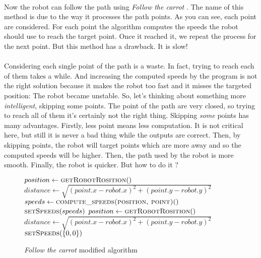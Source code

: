 \paragraph{}{
   Now the robot can follow the path using \textit{Follow the carrot}
 \cite{thesis:barton}. The name of this method is due to the way it processes
 the path points. As you can see, each point are considered. For each point the
 algorithm computes the speeds the robot should use to reach the target point.
 Once it reached it, we repeat the process for the next point. But this
 method has a drawback. It is slow!
}

\paragraph{}{
    Considering each single point of the path is a waste. In fact, trying to
 reach each of them takes a while. And increasing the computed speeds by the
 program is not the right solution because it makes the robot too fast and it
 misses the targeted position: The robot became unstable. So, let's thinking
 about something more \textit{intelligent}, skipping some points. \newline
 The point of the path are very closed, so trying to reach all of them it's
 certainly not the right thing. Skipping \textit{some} points has many
 advantages. Firstly, less point means less computation. It is not critical  
 here, but still it is never a bad thing while the outputs are correct. Then, by
 skipping points, the robot will target points which are more away and so the
 computed speeds will be higher. Then, the path used by the robot is more
 smooth. Finally, the robot is quicker. But how to do it ?
}

\begin{figure}[!h]
    \begin{algorithmic}
            \State $position \gets \Call{getRobotRosition}$
            \State $distance \gets \sqrt{(point.x - robot.x)^{2} + (point.y - robot.y)^{2}}$
                    \State $speeds \gets \Call{compute\_speeds(position, point)}$
                    \State $\Call{setSpeeds}{speeds}$
                    \State $position \gets \Call{getRobotRosition}$
                    \State $distance \gets \sqrt{(point.x - robot.x)^{2} + (point.y - robot.y)^{2}}$
                \EndWhile
            \EndIf
        \EndFor
        \State $\Call{setSpeeds}{\{ 0, 0\}}$
    \end{algorithmic}
    
    \caption{
        \label{algo:v2}
        \textit{Follow the carrot} modified algorithm
    }
\end{figure}


